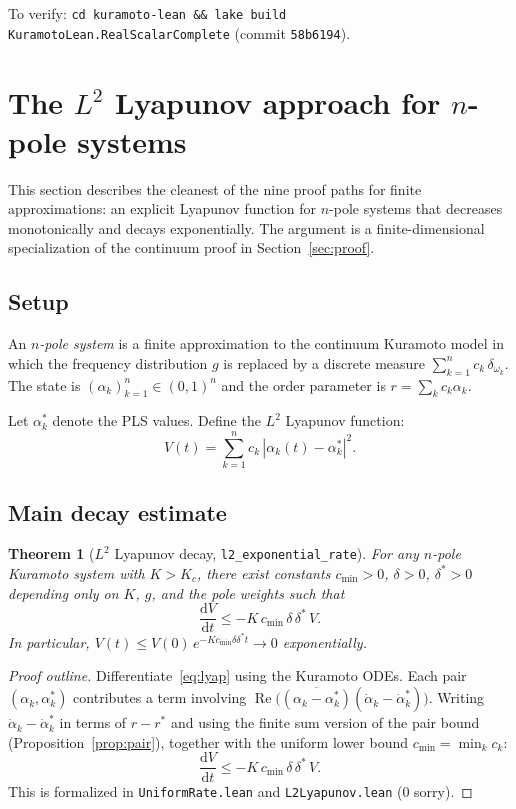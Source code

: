 \documentclass[11pt,a4paper]{article}
\newtheorem{theorem}{Theorem}[section]
\theoremstyle{definition}
\DeclareMathOperator{\re}{Re}
\begin{document}
\medskip\noindent To verify: \texttt{cd kuramoto-lean \&\& lake build KuramotoLean.RealScalarComplete} (commit \texttt{58b6194}).

\section{The $L^2$ Lyapunov approach for $n$-pole systems}\label{sec:npole}

This section describes the cleanest of the nine proof paths for finite approximations: an explicit Lyapunov function for $n$-pole systems that decreases monotonically and decays exponentially. The argument is a finite-dimensional specialization of the continuum proof in Section~\ref{sec:proof}.

\subsection{Setup}

An \emph{$n$-pole system} is a finite approximation to the continuum Kuramoto model in which the frequency distribution $g$ is replaced by a discrete measure $\sum_{k=1}^n c_k\,\delta_{\omega_k}$. The state is $(\alpha_k)_{k=1}^n \in (0,1)^n$ and the order parameter is $r = \sum_k c_k \alpha_k$.

Let $\alpha^*_k$ denote the PLS values. Define the $L^2$ Lyapunov function:
\begin{equation}\label{eq:lyap}
V(t) = \sum_{k=1}^n c_k\,|\alpha_k(t) - \alpha^*_k|^2.
\end{equation}

\subsection{Main decay estimate}

\begin{theorem}[$L^2$ Lyapunov decay, \texttt{l2\_exponential\_rate}]\label{thm:lyapunov}
For any $n$-pole Kuramoto system with $K > K_c$, there exist constants $c_{\min} > 0$, $\delta > 0$, $\delta^* > 0$ depending only on $K$, $g$, and the pole weights such that
\[
\frac{\mathrm{d}V}{\mathrm{d}t} \leq -K\,c_{\min}\,\delta\,\delta^*\,V.
\]
In particular, $V(t) \leq V(0)\,e^{-Kc_{\min}\delta\delta^* t} \to 0$ exponentially.
\end{theorem}

\begin{proof}[Proof outline]
Differentiate~\eqref{eq:lyap} using the Kuramoto ODEs. Each pair $(\alpha_k, \alpha^*_k)$ contributes a term involving $\re\bigl(\overline{(\alpha_k - \alpha^*_k)}(\dot\alpha_k - \dot\alpha^*_k)\bigr)$. Writing $\dot\alpha_k - \dot\alpha^*_k$ in terms of $r - r^*$ and using the finite sum version of the pair bound (Proposition~\ref{prop:pair}), together with the uniform lower bound $c_{\min} = \min_k c_k$:
\[
\frac{\mathrm{d}V}{\mathrm{d}t} \leq -K\,c_{\min}\,\delta\,\delta^*\,V.
\]
This is formalized in \texttt{UniformRate.lean} and \texttt{L2Lyapunov.lean} (0 sorry).
\end{proof}
\end{document}
